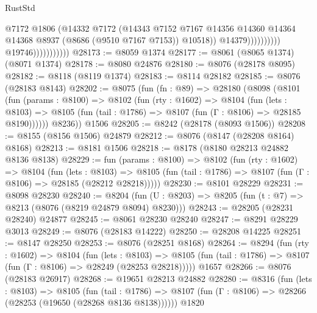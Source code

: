 \begin{lexlean}{RustStd}
\begin{coremodule}
                                              @7172
                                              @1806
                                              (@14332
                                                @7172
                                                (@14343
                                                  @7152
                                                  @7167
                                                  @14356
                                                  @14360
                                                  @14364
                                                  @14368
                                                  @8937
                                                  (@8686 (@9510 @7167 @7153))
                                                  @10518))
                                              @14379))))))))))
                          @19746)))))))))))
@28173 := @8059 @1374
@28177 := @8061 (@8065 @1374) (@8071 @1374)
@28178 := @8080 @24876
@28180 := @8076 (@28178 @8095)
@28182 := @8118 (@8119 @1374)
@28183 := @8114 @28182
@28185 := @8076 (@28183 @8143)
@28202 := @8075
    (fun (fn : @89) =>
    @28180
      (@8098
        (@8101
          (fun (params : @8100) =>
          @8102
            (fun (rty : @1602) =>
            @8104
              (fun (lets : @8103) =>
              @8105 (fun (tail : @1786) => @8107 (fun (Γ : @8106) => @28185 @8190))))))
        @8236))
    @1506
@28205 := @8242 (@28178 (@8093 @1506))
@28208 := @8155 (@8156 @1506) @24879
@28212 := @8076 (@8147 (@28208 @8164) @8168)
@28213 := @8181 @1506
@28218 := @8178 (@8180 @28213 @24882 @8136 @8138)
@28229 := fun (params : @8100) =>
  @8102
    (fun (rty : @1602) =>
    @8104
      (fun (lets : @8103) =>
      @8105 (fun (tail : @1786) => @8107 (fun (Γ : @8106) => @28185 (@28212 @28218)))))
@28230 := @8101 @28229
@28231 := @8098 @28230
@28240 := @8204
    (fun (U : @8203) => @8205 (fun (t : @7) => @8213 (@8076 (@8219 @24879 @8094) @8230)))
@28243 := @28205 (@28231 @28240) @24877
@28245 := @8061 @28230 @28240
@28247 := @8291 @28229 @3013
@28249 := @8076 (@28183 @14222)
@28250 := @28208 @14225
@28251 := @8147 @28250
@28253 := @8076 (@28251 @8168)
@28264 := @8294
    (fun (rty : @1602) =>
    @8104
      (fun (lets : @8103) =>
      @8105 (fun (tail : @1786) => @8107 (fun (Γ : @8106) => @28249 (@28253 @28218)))))
    @1657
@28266 := @8076 (@28183 @26917)
@28268 := @19651 @28213 @24882
@28280 := @8316
    (fun (lets : @8103) =>
    @8105
      (fun (tail : @1786) =>
      @8107 (fun (Γ : @8106) => @28266 (@28253 (@19650 (@28268 @8136 @8138))))))
    @1820

\end{coremodule}
\end{lexlean}
